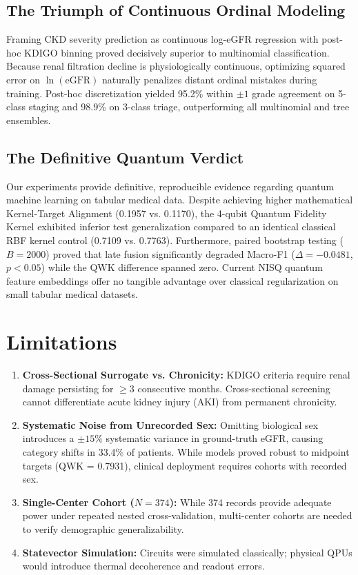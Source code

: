 \documentclass[10pt,conference]{IEEEtran}
\begin{document}
\subsection{The Triumph of Continuous Ordinal Modeling}
Framing CKD severity prediction as continuous log-eGFR regression with post-hoc KDIGO binning proved decisively superior to multinomial classification. Because renal filtration decline is physiologically continuous, optimizing squared error on $\ln(\text{eGFR})$ naturally penalizes distant ordinal mistakes during training. Post-hoc discretization yielded 95.2\% within $\pm 1$ grade agreement on 5-class staging and 98.9\% on 3-class triage, outperforming all multinomial and tree ensembles.

\subsection{The Definitive Quantum Verdict}
Our experiments provide definitive, reproducible evidence regarding quantum machine learning on tabular medical data. Despite achieving higher mathematical Kernel-Target Alignment (0.1957 vs. 0.1170), the 4-qubit Quantum Fidelity Kernel exhibited inferior test generalization compared to an identical classical RBF kernel control (0.7109 vs. 0.7763). Furthermore, paired bootstrap testing ($B = 2000$) proved that late fusion significantly degraded Macro-F1 ($\Delta = -0.0481$, $p < 0.05$) while the QWK difference spanned zero. Current NISQ quantum feature embeddings offer no tangible advantage over classical regularization on small tabular medical datasets.

\section{Limitations}
\begin{enumerate}
    \item \textbf{Cross-Sectional Surrogate vs. Chronicity:} KDIGO criteria require renal damage persisting for $\ge 3$ consecutive months. Cross-sectional screening cannot differentiate acute kidney injury (AKI) from permanent chronicity.
    \item \textbf{Systematic Noise from Unrecorded Sex:} Omitting biological sex introduces a $\pm 15\%$ systematic variance in ground-truth eGFR, causing category shifts in 33.4\% of patients. While models proved robust to midpoint targets (QWK = 0.7931), clinical deployment requires cohorts with recorded sex.
    \item \textbf{Single-Center Cohort ($N = 374$):} While 374 records provide adequate power under repeated nested cross-validation, multi-center cohorts are needed to verify demographic generalizability.
    \item \textbf{Statevector Simulation:} Circuits were simulated classically; physical QPUs would introduce thermal decoherence and readout errors.
\end{enumerate}
\end{document}
